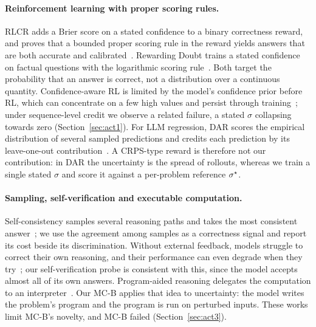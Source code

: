 \paragraph{Reinforcement learning with proper scoring rules.}
RLCR adds a Brier score on a stated confidence to a binary correctness reward, and proves that a bounded proper
scoring rule in the reward yields answers that are both accurate and calibrated~\citep{damani2026rlcr}.
Rewarding Doubt trains a stated confidence on factual questions with the logarithmic scoring
rule~\citep{baniharouni2026doubt}.
Both target the probability that an answer is correct, not a distribution over a continuous quantity.
Confidence-aware RL is limited by the model's confidence prior before RL, which can concentrate on a few high values and
persist through training~\citep{wang2026pitfalls}; under sequence-level credit we observe a related failure, a stated
$\sigma$ collapsing towards zero (Section~\ref{sec:act1}).
For LLM regression, DAR scores the empirical distribution of several sampled predictions and credits each prediction
by its leave-one-out contribution~\citep{park2026dar}.
A CRPS-type reward is therefore not our contribution: in DAR the uncertainty is the spread of rollouts, whereas we
train a single stated $\sigma$ and score it against a per-problem reference $\sigma^{\star}$.

\paragraph{Sampling, self-verification and executable computation.}
Self-consistency samples several reasoning paths and takes the most consistent answer~\citep{wang2023selfconsistency};
we use the agreement among samples as a correctness signal and report its cost beside its discrimination.
Without external feedback, models struggle to correct their own reasoning, and their performance can even degrade
when they try~\citep{huang2024selfcorrect}; our self-verification probe is consistent with this, since the model
accepts almost all of its own answers.
Program-aided reasoning delegates the computation to an interpreter~\citep{gao2023pal,chen2023pot}.
Our MC-B applies that idea to uncertainty: the model writes the problem's program and the program is run on perturbed
inputs.
These works limit MC-B's novelty, and MC-B failed (Section~\ref{sec:act3}).

